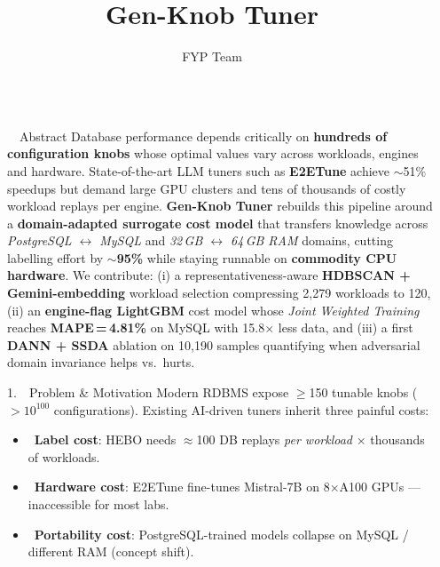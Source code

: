 \documentclass[final,t]{beamer}
\title{Gen-Knob Tuner}
\author{FYP Team}
\institute{University of Moratuwa}
\date{}
\newcommand{\cross}{\textcolor{AccentRed}{\ding{55}}}
\newcommand{\Hi}[1]{\textbf{\color{MoraMaroon}#1}}
\newcommand{\KW}[1]{\textbf{\color{DeepBlue}#1}}
\newcommand{\OK}[1]{\textbf{\color{DeepGreen}#1}}
\newlength{\sepwidth}
\newlength{\colwidth}
\newcommand{\sepcol}{\begin{column}{\sepwidth}\end{column}}
\begin{document}
\begin{frame}[t,fragile]

\begin{columns}[t]
\sepcol

\begin{column}{\colwidth}

\begin{alertblock}{\ \ Abstract}
\justifying
\small
Database performance depends critically on \Hi{hundreds of configuration knobs}
whose optimal values vary across workloads, engines and hardware.
State-of-the-art LLM tuners such as \KW{E2ETune} achieve $\sim$51\% speedups
but demand large GPU clusters and tens of thousands of costly workload replays per engine.
\textbf{Gen-Knob Tuner} rebuilds this pipeline around a \Hi{domain-adapted surrogate cost model}
that transfers knowledge across \textit{PostgreSQL $\leftrightarrow$ MySQL} and
\textit{32\,GB $\leftrightarrow$ 64\,GB RAM} domains, cutting labelling effort by \OK{$\sim$95\%}
while staying runnable on \KW{commodity CPU hardware}.
We contribute: (i) a representativeness-aware \Hi{HDBSCAN + Gemini-embedding} workload
selection compressing 2{,}279 workloads to 120, (ii) an \Hi{engine-flag LightGBM}
cost model whose \textit{Joint Weighted Training} reaches \textbf{MAPE\,=\,4.81\%} on MySQL with 15.8$\times$ less
data, and (iii) a first \Hi{DANN + SSDA} ablation on 10{,}190 samples quantifying when
adversarial domain invariance helps vs.\ hurts.
\end{alertblock}

\begin{block}{1.\ \ Problem \& Motivation}
\justifying
\small
Modern RDBMS expose $\geq$150 tunable knobs ($>\!10^{100}$ configurations). Existing AI-driven tuners inherit three painful costs:

\vspace{0.15em}
\begin{itemize}
\setlength{\itemsep}{0.1em}
  \item \cross\ \textbf{Label cost}: HEBO needs $\approx$100 DB replays \emph{per workload} $\times$ thousands of workloads.
  \item \cross\ \textbf{Hardware cost}: E2ETune fine-tunes Mistral-7B on 8$\times$A100 GPUs --- inaccessible for most labs.
  \item \cross\ \textbf{Portability cost}: PostgreSQL-trained models collapse on MySQL / different RAM (concept shift).
\end{itemize}


\end{block}
\end{column}
\end{columns}
\end{frame}
\end{document}
